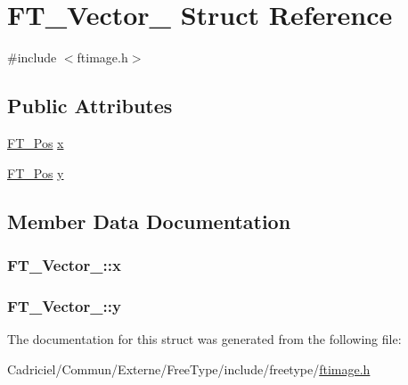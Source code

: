 \hypertarget{struct_f_t___vector__}{\section{F\-T\-\_\-\-Vector\-\_\- Struct Reference}
\label{struct_f_t___vector__}
}


{\ttfamily \#include $<$ftimage.\-h$>$}

\subsection*{Public Attributes}
\begin{DoxyCompactItemize}
\item 
\hyperlink{ftimage_8h_af5f230f4b253d4c7715fd2e595614c90}{F\-T\-\_\-\-Pos} \hyperlink{struct_f_t___vector___a941e818e6dfca06409cddff4f325f74c}{x}
\item 
\hyperlink{ftimage_8h_af5f230f4b253d4c7715fd2e595614c90}{F\-T\-\_\-\-Pos} \hyperlink{struct_f_t___vector___ac3246ed214e880047ec74eeb15f8b973}{y}
\end{DoxyCompactItemize}


\subsection{Member Data Documentation}
\hypertarget{struct_f_t___vector___a941e818e6dfca06409cddff4f325f74c}{
\subsubsection[{x}]{ F\-T\-\_\-\-Vector\-\_\-\-::x}}\label{struct_f_t___vector___a941e818e6dfca06409cddff4f325f74c}
\hypertarget{struct_f_t___vector___ac3246ed214e880047ec74eeb15f8b973}{
\subsubsection[{y}]{ F\-T\-\_\-\-Vector\-\_\-\-::y}}\label{struct_f_t___vector___ac3246ed214e880047ec74eeb15f8b973}


The documentation for this struct was generated from the following file\-:\begin{DoxyCompactItemize}
\item 
Cadriciel/\-Commun/\-Externe/\-Free\-Type/include/freetype/\hyperlink{ftimage_8h}{ftimage.\-h}\end{DoxyCompactItemize}
